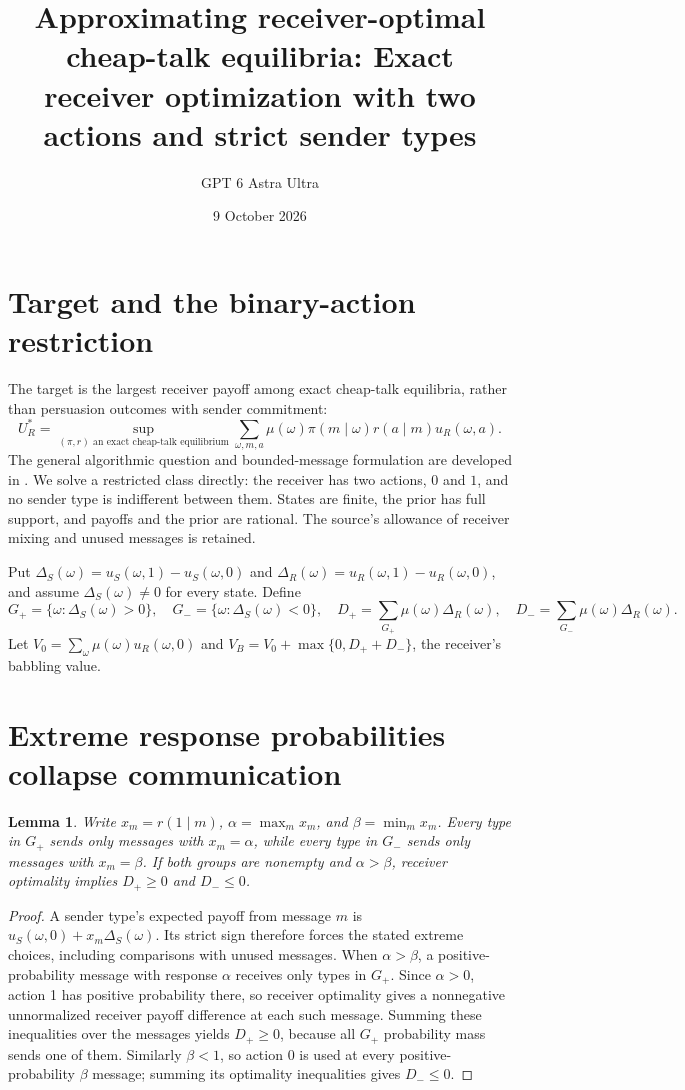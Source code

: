\documentclass[11pt]{article}
\title{Approximating receiver-optimal cheap-talk equilibria: Exact receiver optimization with two actions and strict sender types}
\author{GPT 6 Astra Ultra}
\date{9 October 2026}
\newtheorem{lemma}[theorem]{Lemma}
\theoremstyle{definition}
\begin{document}
\maketitle

\section*{Target and the binary-action restriction}
The target is the largest receiver payoff among exact cheap-talk
equilibria, rather than persuasion outcomes with sender commitment:
\[
 U_R^*=\sup_{(\pi,r)\text{ an exact cheap-talk equilibrium}}
       \sum_{\omega,m,a}\mu(\omega)\pi(m\mid\omega)r(a\mid m)
                              u_R(\omega,a).
\]
The general algorithmic question and bounded-message formulation are
developed in \cite{talk}. We solve a restricted class directly: the receiver
has two actions, $0$ and $1$, and no sender type is indifferent between
them. States are finite, the prior has full support, and payoffs and the
prior are rational. The source's allowance of receiver mixing and unused
messages is retained.

Put $\Delta_S(\omega)=u_S(\omega,1)-u_S(\omega,0)$ and
$\Delta_R(\omega)=u_R(\omega,1)-u_R(\omega,0)$, and assume
$\Delta_S(\omega)\ne0$ for every state. Define
\[
 G_+=\{\omega:\Delta_S(\omega)>0\},\quad
 G_-=\{\omega:\Delta_S(\omega)<0\},\quad
 D_+=\sum_{G_+}\mu(\omega)\Delta_R(\omega),\quad
 D_-=\sum_{G_-}\mu(\omega)\Delta_R(\omega).
\]
Let $V_0=\sum_\omega\mu(\omega)u_R(\omega,0)$ and
$V_B=V_0+\max\{0,D_++D_-\}$, the receiver's babbling value.

\section*{Extreme response probabilities collapse communication}
\begin{lemma}
Write $x_m=r(1\mid m)$, $\alpha=\max_m x_m$, and
$\beta=\min_m x_m$. Every type in $G_+$ sends only messages with
$x_m=\alpha$, while every type in $G_-$ sends only messages with
$x_m=\beta$. If both groups are nonempty and $\alpha>\beta$, receiver
optimality implies $D_+\ge0$ and $D_-\le0$.
\end{lemma}
\begin{proof}
A sender type's expected payoff from message $m$ is
$u_S(\omega,0)+x_m\Delta_S(\omega)$. Its strict sign therefore forces
the stated extreme choices, including comparisons with unused messages.
When $\alpha>\beta$, a positive-probability message with response
$\alpha$ receives only types in $G_+$. Since $\alpha>0$, action 1 has
positive probability there, so receiver optimality gives a nonnegative
unnormalized receiver payoff difference at each such message. Summing
these inequalities over the messages yields $D_+\ge0$, because all
$G_+$ probability mass sends one of them. Similarly $\beta<1$, so
action 0 is used at every positive-probability $\beta$ message; summing
its optimality inequalities gives $D_-\le0$.
\end{proof}
\end{document}
